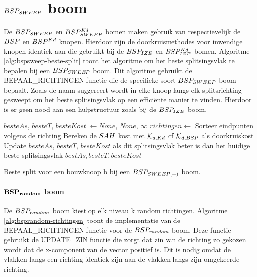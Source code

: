 \section{$BSP_{SWEEP}$ boom}
\label{sec:h4-bspsweep}
De $BSP_{SWEEP}$ en $BSP^{Kd}_{SWEEP}$ bomen maken gebruik van respectievelijk de $BSP$ en $BSP^{Kd}$ knopen.
Hierdoor zijn de doorkruismethodes voor inwendige knopen identiek aan die gebruikt bij de $BSP_{IZE}$ en $BSP^{Kd}_{IZE}$ bomen.
Algoritme \ref{alg:bspsweep-beste-split} toont het algoritme om het beste splitsingsvlak te bepalen bij een $BSP_{SWEEP}$ boom.
Dit algoritme gebruikt de BEPAAL\_RICHTINGEN functie die de specifieke soort $BSP_{SWEEP}$ boom bepaalt.
Zoals de naam suggereert wordt in elke knoop langs elk splitsrichting gesweept om het beste splitsingsvlak op een efficiënte manier te vinden.
Hierdoor is er geen nood aan een hulpstructuur zoals bij de $BSP_{IZE}$ boom.

\begin{dutchalgorithm}
    \begin{algorithmic}       
            \State $besteAs$, $besteT$, $besteKost$ $\gets None$, $None$, $\infty$
            \State $richtingen \gets $ 
                \State Sorteer eindpunten volgens de richting
                    \State Bereken de $SAH$ kost met $\mathcal{K}_{d,Kd}$ of $\mathcal{K}_{d,BSP}$ als doorkruiskost
                    \State Update $besteAs$, $besteT$, $besteKost$ als dit splitsingsvlak beter is dan het huidige beste splitsingsvlak
                \EndFor     
            \EndFor
            \State \Return $bestAs, besteT, besteKost$
        \EndFunction
    \end{algorithmic}
    \caption{Beste split voor een bouwknoop b bij een $BSP_{SWEEP(+)}$  boom.}
    \label{alg:bspsweep-beste-split}
\end{dutchalgorithm}

\paragraph{$\mathbf{BSP_{random}}$ boom}
De $BSP_{random}$ boom kiest op elk niveau k random richtingen.
Algoritme \ref{alg:bsprandom-richtingen} toont de implementatie van de BEPAAL\_RICHTINGEN functie voor de $BSP_{random}$ boom. 
Deze functie gebruikt de UPDATE\_ZIN functie die zorgt dat zin van de richting zo gekozen wordt dat de x-component van de vector positief is.
Dit is nodig omdat de vlakken langs een richting identiek zijn aan de vlakken langs zijn omgekeerde richting.

